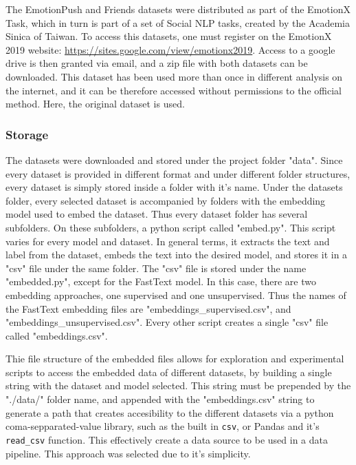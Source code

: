 The EmotionPush and Friends datasets were distributed as part of the EmotionX Task, which in turn is part of a set of Social NLP tasks, created by the Academia Sinica of Taiwan. \cite{TODO} To access this datasets, one must register on the EmotionX 2019 website: \url{https://sites.google.com/view/emotionx2019}. Access to a google drive is then granted via email, and a zip file with both datasets can be downloaded. This dataset has been used more than once in different analysis on the internet, and it can be therefore accessed without permissions to the official method. Here, the original dataset is used.

\subsubsection{Storage}\label{subs:Storage}
The datasets were downloaded and stored under the project folder "data". Since every dataset is provided in different format and under different folder structures, every dataset is simply stored inside a folder with it's name.
Under the datasets folder, every selected dataset is accompanied by folders with the embedding model used to embed the dataset. Thus every dataset folder has several subfolders. On these subfolders, a python script called "embed.py". This script varies for every model and dataset. In general terms, it extracts the text and label from the dataset, embeds the text into the desired model, and stores it in a "csv" file under the same folder.
The "csv" file is stored under the name "embedded.py", except for the FastText model. In this case, there are two embedding approaches, one supervised and one unsupervised. Thus the names of the FastText embedding files are "embeddings_supervised.csv", and "embeddings_unsupervised.csv". Every other script creates a single "csv" file called "embeddings.csv".

Thie file structure of the embedded files allows for exploration and experimental scripts to access the embedded data of different datasets, by building a single string with the dataset and model selected. This string must be prepended by the "./data/" folder name, and appended with the "embeddings.csv" string to generate a path that creates accesibility to the different datasets via a python coma-sepparated-value library, such as the built in \lstinline{csv}, or Pandas \cite{TODO} and it's \lstinline{read_csv} function. This effectively create a data source to be used in a data pipeline. This approach was selected due to it's simplicity.


